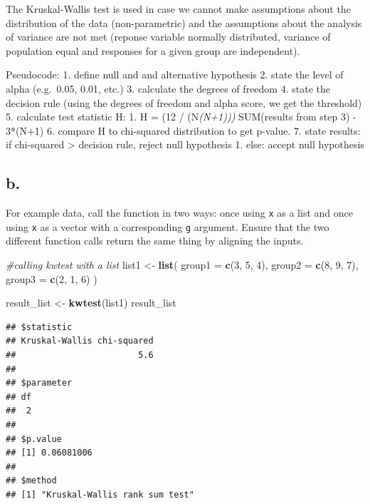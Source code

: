 \documentclass[
]{article}
\newenvironment{Shaded}{\begin{snugshade}}{\end{snugshade}}
\newcommand{\AttributeTok}[1]{\textcolor[rgb]{0.13,0.29,0.53}{#1}}
\newcommand{\CommentTok}[1]{\textcolor[rgb]{0.56,0.35,0.01}{\textit{#1}}}
\newcommand{\DecValTok}[1]{\textcolor[rgb]{0.00,0.00,0.81}{#1}}
\newcommand{\FunctionTok}[1]{\textcolor[rgb]{0.13,0.29,0.53}{\textbf{#1}}}
\newcommand{\NormalTok}[1]{#1}
\newcommand{\OtherTok}[1]{\textcolor[rgb]{0.56,0.35,0.01}{#1}}
\begin{document}
The Kruskal-Wallis test is used in case we cannot make assumptions about
the distribution of the data (non-parametric) and the assumptions about
the analysis of variance are not met (reponse variable normally
distributed, variance of population equal and responses for a given
group are independent).

Pseudocode: 1. define null and and alternative hypothesis 2. state the
level of alpha (e.g.~0.05, 0.01, etc.) 3. calculate the degrees of
freedom 4. state the decision rule (using the degrees of freedom and
alpha score, we get the threshold) 5. calculate test statistic H: 1. H =
(12 / (N\emph{(N+1))) } SUM(results from step 3) - 3*(N+1) 6. compare H
to chi-squared distribution to get p-value. 7. state results: if
chi-squared \textgreater{} decision rule, reject null hypothesis 1.
else: accept null hypothesis

\subsection{b.}\label{b.-5}

For example data, call the function in two ways: once using \texttt{x}
as a list and once using \texttt{x} as a vector with a corresponding
\texttt{g} argument. Ensure that the two different function calls return
the same thing by aligning the inputs.

\begin{Shaded}
\begin{Highlighting}[]
\CommentTok{\#calling kwtest with a list}
\NormalTok{list1 }\OtherTok{\textless{}{-}} \FunctionTok{list}\NormalTok{(}
  \AttributeTok{group1 =} \FunctionTok{c}\NormalTok{(}\DecValTok{3}\NormalTok{, }\DecValTok{5}\NormalTok{, }\DecValTok{4}\NormalTok{),}
  \AttributeTok{group2 =} \FunctionTok{c}\NormalTok{(}\DecValTok{8}\NormalTok{, }\DecValTok{9}\NormalTok{, }\DecValTok{7}\NormalTok{),}
  \AttributeTok{group3 =} \FunctionTok{c}\NormalTok{(}\DecValTok{2}\NormalTok{, }\DecValTok{1}\NormalTok{, }\DecValTok{6}\NormalTok{)}
\NormalTok{)}

\NormalTok{result\_list }\OtherTok{\textless{}{-}} \FunctionTok{kwtest}\NormalTok{(list1)}
\NormalTok{result\_list}
\end{Highlighting}
\end{Shaded}

\begin{verbatim}
## $statistic
## Kruskal-Wallis chi-squared 
##                        5.6 
## 
## $parameter
## df 
##  2 
## 
## $p.value
## [1] 0.06081006
## 
## $method
## [1] "Kruskal-Wallis rank sum test"
\end{verbatim}
\end{document}
